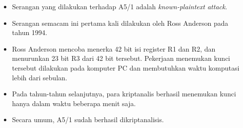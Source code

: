 \documentclass{article}
\begin{document}

\begin{itemize}
  \item Serangan yang dilakukan terhadap A5/1 adalah \textit{known-plaintext attack}.
  \item Serangan semacam ini pertama kali dilakukan oleh Ross Anderson pada tahun 1994.
  \item Ross Anderson mencoba menerka 42 bit isi register R1 dan R2, dan menurunkan 23 bit R3 dari 42 bit tersebut. Pekerjaan menemukan kunci tersebut dilakukan pada komputer PC dan membutuhkan waktu komputasi lebih dari sebulan.
  \item Pada tahun-tahun selanjutnya, para kriptanalis berhasil menemukan kunci hanya dalam waktu beberapa menit saja.
  \item Secara umum, A5/1 sudah berhasil dikriptanalisis.
\end{itemize}
\end{document}
